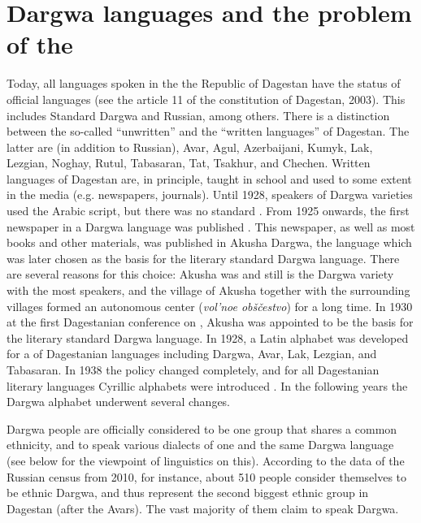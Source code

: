 
\section{Dargwa languages and the problem of the }
\label{sec:Dargwa languages and the problem of the Dargwa ethnicity}

Today, all languages spoken in the the Republic of Dagestan have the status of official languages (see the article 11 of the constitution of Dagestan, 2003). This includes Standard Dargwa and Russian, among others. There is a distinction between the so-called ``unwritten'' and the ``written languages'' of Dagestan. The latter are (in addition to Russian), Avar, Agul, Azerbaijani, Kumyk, Lak, Lezgian, Noghay, Rutul, Tabasaran, Tat, Tsakhur, and Chechen. Written languages of Dagestan are, in principle, taught in school and used to some extent in the media (e.g. newspapers, journals). Until 1928, speakers of Dargwa varieties used the Arabic script, but there was no standard . From 1925 onwards, the first newspaper in a Dargwa language was published \citep[15]{Abdullaev1954}. This newspaper, as well as most books and other materials, was published in Akusha Dargwa, the language which was later chosen as the basis for the literary standard Dargwa language. There are several reasons for this choice: Akusha was and still is the Dargwa variety with the most speakers, and the village of Akusha together with the surrounding villages formed an autonomous center (\textit{vol'noe obščestvo}) for a long time. In 1930 at the first Dagestanian conference on , Akusha was appointed to be the basis for the literary standard Dargwa language. In 1928, a Latin alphabet was developed for a  of Dagestanian languages including Dargwa, Avar, Lak, Lezgian, and Tabasaran. In 1938 the policy changed completely, and for all Dagestanian literary languages Cyrillic alphabets were introduced \citep[48]{Grenoble2003}. In the following years the Dargwa alphabet underwent several changes.

Dargwa people are officially considered to be one group that shares a common ethnicity, and to speak various dialects of one and the same Dargwa language (see below for the viewpoint of linguistics on this). According to the data of the Russian census from 2010, for instance, about 510 people consider themselves to be ethnic Dargwa, and thus represent the second biggest ethnic group in Dagestan (after the Avars). The vast majority of them claim to speak Dargwa.

